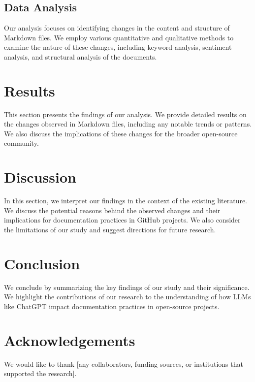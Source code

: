 \documentclass[a4paper, 12pt]{article}
\begin{document}
\subsection{Data Analysis}
Our analysis focuses on identifying changes in the content and structure of Markdown files. We employ various quantitative and qualitative methods to examine the nature of these changes, including keyword analysis, sentiment analysis, and structural analysis of the documents.

\section{Results}
\label{sec:results}
This section presents the findings of our analysis. We provide detailed results on the changes observed in Markdown files, including any notable trends or patterns. We also discuss the implications of these changes for the broader open-source community.

\section{Discussion}
\label{sec:discussion}
In this section, we interpret our findings in the context of the existing literature. We discuss the potential reasons behind the observed changes and their implications for documentation practices in GitHub projects. We also consider the limitations of our study and suggest directions for future research.

\section{Conclusion}
\label{sec:conclusion}
We conclude by summarizing the key findings of our study and their significance. We highlight the contributions of our research to the understanding of how LLMs like ChatGPT impact documentation practices in open-source projects.

\section*{Acknowledgements}
We would like to thank [any collaborators, funding sources, or institutions that supported the research].



\end{document}
